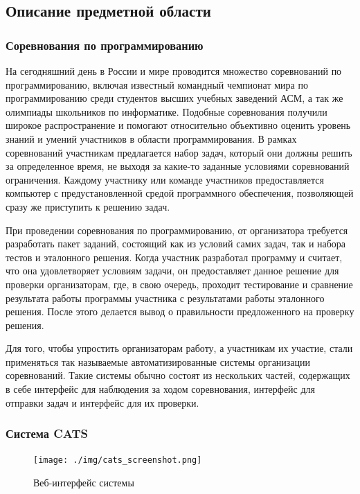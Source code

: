 \documentclass{imcs}
\begin{document}
\subsection{Описание предметной области}
\subsubsection{Соревнования по программированию}

На сегодняшний день в России и мире проводится множество соревнований по программированию, включая известный командный чемпионат мира по программированию среди студентов высших учебных заведений АСМ\cite{acm}, а так же олимпиады школьников по информатике.
Подобные соревнования получили широкое распространение и помогают относительно объективно оценить уровень знаний и умений участников в области программирования\cite{prog_challenges}.
В рамках соревнований участникам предлагается набор задач, который они должны решить за определенное время, не выходя за какие-то заданные условиями соревнований ограничения.
Каждому участнику или команде участников предоставляется компьютер с предустановленной средой программного обеспечения, позволяющей сразу же приступить к решению задач.

При проведении соревнования по программированию, от организатора требуется разработать пакет заданий, состоящий как из условий самих задач, так и набора тестов и эталонного решения.
Когда участник разработал программу и считает, что она удовлетворяет условиям задачи, он предоставляет данное решение для проверки организаторам, где, в свою очередь, проходит тестирование и сравнение результата работы программы участника с результатами работы эталонного решения. После этого делается вывод о правильности предложенного на проверку решения.

Для того, чтобы упростить организаторам работу, а участникам их участие, стали применяться так называемые автоматизированные системы организации соревнований. Такие системы обычно состоят из нескольких частей, содержащих в себе интерфейс для наблюдения за ходом соревнования, интерфейс для отправки задач и интерфейс для их проверки. 
\FloatBarrier
\subsubsection{Система CATS}

\begin{figure}[htb]
\centering
\texttt{[image: ./img/cats\_screenshot.png]}
\caption{Веб-интерфейс системы}
\label{cats_screenshot}
\end{figure}
\end{document}
